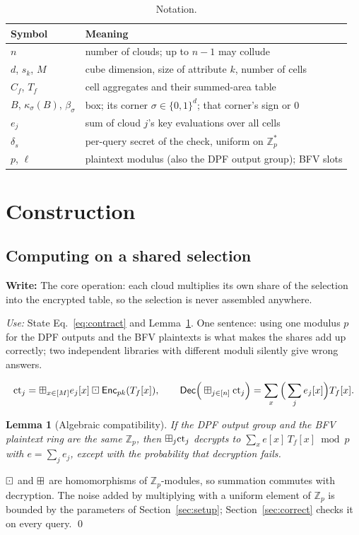 \documentclass[a4paper,fleqn]{cas-sc}
\newif\ifskeleton \skeletontrue          %
\newcommand{\para}[2]{\ifskeleton\begin{parabox}\textbf{Write:} #1
  \par\smallskip\textit{Use:} #2\end{parabox}\fi}
\newtheorem{lemma}{Lemma}
\begin{document}
\begin{table}[pos=htbp]
\caption{Notation.}
\label{tab:notation}
\centering
\footnotesize
\begin{tabular}{@{}ll@{}}
\toprule
Symbol & Meaning \\
\midrule
$n$ & number of clouds; up to $n-1$ may collude \\
$d$, $s_k$, $M$ & cube dimension, size of attribute $k$, number of cells \\
$C_f$, $T_f$ & cell aggregates and their summed-area table \\
$B$, $\kappa_\sigma(B)$, $\beta_\sigma$ & box; its corner $\sigma\in\{0,1\}^d$; that corner's sign or $0$ \\
$e_j$ & sum of cloud $j$'s key evaluations over all cells \\
$\delta_s$ & per-query secret of the check, uniform on $\mathbb{Z}_p^{*}$ \\
$p$, $\ell$ & plaintext modulus (also the DPF output group); BFV slots \\
\bottomrule
\end{tabular}
\end{table}

\section{Construction}
\label{sec:construction}

\subsection{Computing on a shared selection}
\label{sec:oha}

\para{The core operation: each cloud multiplies its own share of the selection
into the encrypted table, so the selection is never assembled anywhere.}{State
Eq.~\eqref{eq:contract} and Lemma~\ref{lem:compat}. One sentence: using one
modulus $p$ for the DPF outputs and the BFV plaintexts is what makes the shares
add up correctly; two independent libraries with different moduli silently give
wrong answers.}

\begin{equation}
\label{eq:contract}
\mathrm{ct}_j=\boxplus_{x\in[M]} e_j[x]\boxdot\mathsf{Enc}_{pk}(T_f[x]),\qquad
\mathsf{Dec}\Big(\boxplus_{j\in[n]}\mathrm{ct}_j\Big)=\sum_{x}\Big(\sum_j e_j[x]\Big)T_f[x].
\end{equation}

\begin{lemma}[Algebraic compatibility]
\label{lem:compat}
If the DPF output group and the BFV plaintext ring are the same $\mathbb{Z}_p$,
then $\boxplus_j\mathrm{ct}_j$ decrypts to $\sum_x e[x]\,T_f[x]\bmod p$ with
$e=\sum_je_j$, except with the probability that decryption fails.
\end{lemma}
\begin{pf}
$\boxdot$ and $\boxplus$ are homomorphisms of $\mathbb{Z}_p$-modules, so summation
commutes with decryption. The noise added by multiplying with a uniform
element of $\mathbb{Z}_p$ is bounded by the parameters of
Section~\ref{sec:setup}; Section~\ref{sec:correct} checks it on every query. \qed
\end{pf}
\end{document}
